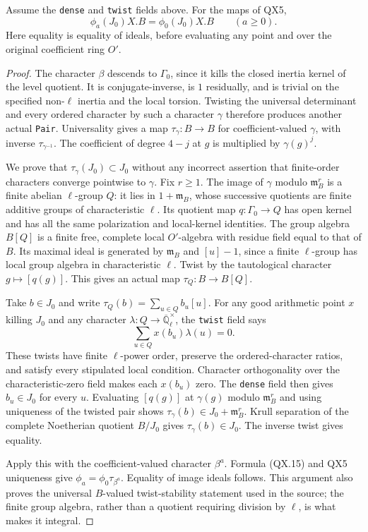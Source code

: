 \begin{proposition}
\label{claim:QX6}
Assume the \texttt{dense} and \texttt{twist} fields above.
For the maps of QX5,
\[
              \phi_a(J_0)X.B=\phi_0(J_0)X.B
                    \qquad(a\ge0).
              \tag{QX.16}
\]
Here equality is equality of ideals, before evaluating any
point and over the original coefficient ring $O'$.
\end{proposition}
\begin{proof}
The character $\beta$ descends to $\Gamma_0$, since it kills
the closed inertia kernel of the level quotient.  It is
conjugate-inverse, is $1$ residually, and is trivial on the
specified non-$\ell$ inertia and the local torsion.
Twisting the universal determinant and every ordered
character by such a character $\gamma$ therefore produces
another actual \texttt{Pair}.  Universality gives a map
$\tau_\gamma:B\to B$ for coefficient-valued $\gamma$,
with inverse $\tau_{\gamma^{-1}}$.  The coefficient of
degree $4-j$ at $g$ is multiplied by $\gamma(g)^j$.

We prove that $\tau_\gamma(J_0)\subset J_0$ without any
incorrect assertion that finite-order characters converge
pointwise to $\gamma$.  Fix $r\ge1$.  The image of $\gamma$
modulo $\mathfrak m_B^r$ is a finite abelian $\ell$-group
$Q$: it lies in $1+\mathfrak m_B$, whose successive
quotients are finite additive groups of characteristic
$\ell$.  Its quotient map $q:\Gamma_0\to Q$ has open
kernel and has all the same polarization and local-kernel
identities.  The group algebra $B[Q]$ is a finite free,
complete local $O'$-algebra with residue field equal to
that of $B$.  Its maximal ideal is generated by
$\mathfrak m_B$ and $[u]-1$, since a finite $\ell$-group
has local group algebra in characteristic $\ell$.
Twist by the tautological character $g\mapsto[q(g)]$.
This gives an actual map $\tau_Q:B\to B[Q]$.

Take $b\in J_0$ and write $\tau_Q(b)=\sum_{u\in Q}b_u[u]$.
For any good arithmetic point $x$ killing $J_0$ and any
character $\lambda:Q\to\overline{\mathbb Q}_\ell^\times$,
the \texttt{twist} field says
\[
                  \sum_{u\in Q}x(b_u)\lambda(u)=0.
                  \tag{QX.17}
\]
These twists have finite $\ell$-power order, preserve the
ordered-character ratios, and satisfy every stipulated
local condition.  Character orthogonality over the
characteristic-zero field makes each $x(b_u)$ zero.
The \texttt{dense} field then gives $b_u\in J_0$ for every
$u$.  Evaluating $[q(g)]$ at $\gamma(g)$ modulo
$\mathfrak m_B^r$ and using uniqueness of the twisted pair
shows
$\tau_\gamma(b)\in J_0+\mathfrak m_B^r$.
Krull separation of the complete Noetherian quotient
$B/J_0$ gives $\tau_\gamma(b)\in J_0$.
The inverse twist gives equality.

Apply this with the coefficient-valued character $\beta^a$.
Formula (QX.15) and QX5 uniqueness give
$\phi_a=\phi_0\tau_{\beta^a}$.  Equality of image ideals
follows.  This argument also proves the universal
$B$-valued twist-stability statement used in the source;
the finite group algebra, rather than a quotient requiring
division by $\ell$, is what makes it integral.
\end{proof}

